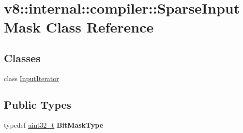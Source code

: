 \hypertarget{classv8_1_1internal_1_1compiler_1_1SparseInputMask}{}\section{v8\+:\+:internal\+:\+:compiler\+:\+:Sparse\+Input\+Mask Class Reference}
\label{classv8_1_1internal_1_1compiler_1_1SparseInputMask}
\subsection*{Classes}
\begin{DoxyCompactItemize}
\item 
class \mbox{\hyperlink{classv8_1_1internal_1_1compiler_1_1SparseInputMask_1_1InputIterator}{Input\+Iterator}}
\end{DoxyCompactItemize}
\subsection*{Public Types}
\begin{DoxyCompactItemize}
\item 
\mbox{\label{classv8_1_1internal_1_1compiler_1_1SparseInputMask_a681e59effbeef252f85aea17d5373f85}} 
typedef \mbox{\hyperlink{classuint32__t}{uint32\+\_\+t}} {\bfseries Bit\+Mask\+Type}
\end{DoxyCompactItemize}
